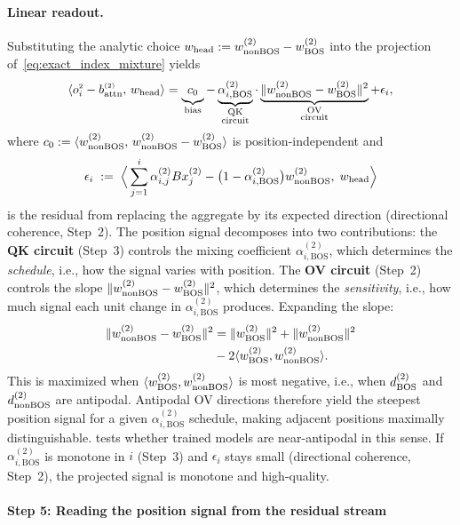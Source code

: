 \documentclass{article}
\theoremstyle{plain}
\theoremstyle{definition}
\theoremstyle{remark}
\begin{document}
\paragraph{Linear readout.}
Substituting the analytic choice $w_{\text{head}} := w_{\text{nonBOS}}^{(2)}-w_{\text{BOS}}^{(2)}$
into the projection of~\eqref{eq:exact_index_mixture} yields
\begin{equation}
\langle \oB{i}-\battnB,\,w_{\text{head}}\rangle
=
\underbrace{c_0\vphantom{\|\wNBOS{2}\|}}_{\text{bias}}
-
\underbrace{\alpha^{(2)}_{i,\mathrm{BOS}}}_{\substack{\text{QK} \\ \text{circuit}}}
\cdot
\underbrace{\|\wNBOS{2}-\wBOS{2}\|^2}_{\substack{\text{OV} \\ \text{circuit}}}
+ \epsilon_i,
\label{eq:head_projection_decomposition}
\end{equation}
where $c_0 := \langle w_{\text{nonBOS}}^{(2)},\, w_{\text{nonBOS}}^{(2)}-w_{\text{BOS}}^{(2)}\rangle$ is
position-independent and
\[
\epsilon_i \;:=\; \Big\langle
\sum_{j=1}^{i}\alpha^{(2)}_{i,j} Bx_j^{(2)}
- \big(1-\alpha^{(2)}_{i,\mathrm{BOS}}\big)w_{\text{nonBOS}}^{(2)},\;
w_{\text{head}}
\Big\rangle
\]
is the residual from replacing the \nbos aggregate by its expected direction (directional coherence, Step~2).
The position signal decomposes into two contributions:
the \textbf{QK circuit} (Step~3) controls the mixing coefficient
$\alpha^{(2)}_{i,\mathrm{BOS}}$, which determines the \emph{schedule},
i.e., how the signal varies with position.
The \textbf{OV circuit} (Step~2) controls the slope
$\|w_{\text{nonBOS}}^{(2)}-w_{\text{BOS}}^{(2)}\|^2$, which determines the
\emph{sensitivity}, i.e., how much signal each unit change in $\alpha^{(2)}_{i,\mathrm{BOS}}$
produces.
Expanding the slope:
\begin{align}
\|w_{\text{nonBOS}}^{(2)}-w_{\text{BOS}}^{(2)}\|^2 \nonumber
&= \|w_{\text{BOS}}^{(2)}\|^2 + \|w_{\text{nonBOS}}^{(2)}\|^2 \\
  &- 2\langle w_{\text{BOS}}^{(2)},w_{\text{nonBOS}}^{(2)}\rangle.
\label{eq:slope_expansion}
\end{align}
This is maximized when $\langle w_{\text{BOS}}^{(2)},w_{\text{nonBOS}}^{(2)}\rangle$ is most
negative, i.e., when $d_{\text{BOS}}^{(2)}$ and $d_{\text{nonBOS}}^{(2)}$ are antipodal.
Antipodal OV directions therefore yield the steepest position signal
for a given $\alpha^{(2)}_{i,\mathrm{BOS}}$ schedule, making adjacent positions maximally
distinguishable.
 tests whether trained models are near-antipodal in this sense.
If $\alpha^{(2)}_{i,\mathrm{BOS}}$ is monotone in $i$ (Step~3) and
$\epsilon_i$ stays small (directional coherence, Step~2), the projected
signal is monotone and high-quality.


\paragraph{Step 5: Reading the position signal from the residual stream}
\label{subsec:mech_step5}
\end{document}
